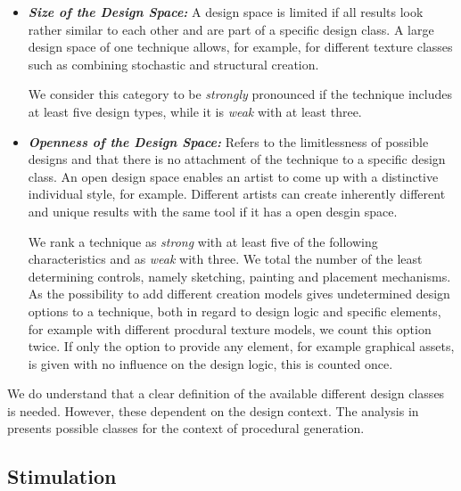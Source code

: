 \begin{itemize}
    \item \textit{\textbf{Size of the Design Space:}} A design space is limited if all results look rather similar to each other and are part of a specific design class. A large design space of one technique allows, for example, for different texture classes such as combining stochastic and structural creation.

    We consider this category to be \textit{strongly} pronounced if the technique includes at least five design types, while it is \textit{weak} with at least three.

    \item \textit{\textbf{Openness of the Design Space:}} Refers to the limitlessness of possible designs and that there is no attachment of the technique to a specific design class. An open design space enables an artist to come up with a distinctive individual style, for example. Different artists can create inherently different and unique results with the same tool if it has a open desgin space.

    We rank a technique as \textit{strong} with at least five of the following characteristics and as \textit{weak} with three. We total the number of the least determining controls, namely sketching, painting and placement mechanisms. As the possibility to add different creation models gives undetermined design options to a technique, both in regard to design logic and specific elements, for example with different procdural texture models, we count this option twice. If only the option to provide any element, for example graphical assets, is given with no influence on the design logic, this is counted once.
    
\end{itemize}

We do understand that a clear definition of the available different design classes is needed. However, these dependent on the design context. The analysis in  presents possible classes for the context of procedural generation.


\subsection{Stimulation}
\label{subsec:taxo_stimulation}

